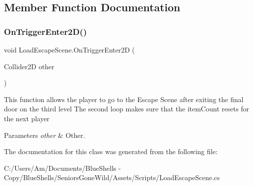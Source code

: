 \subsection{Member Function Documentation}
\mbox{\label{class_load_escape_scene_a5fd7bb04123701797923ddee003e3ace}} 
\subsubsection{\texorpdfstring{On\+Trigger\+Enter2\+D()}{OnTriggerEnter2D()}}
{\footnotesize\ttfamily void Load\+Escape\+Scene.\+On\+Trigger\+Enter2D (\begin{DoxyParamCaption}\item[{Collider2D}]{other }\end{DoxyParamCaption})\hspace{0.3cm}{\ttfamily [private]}}



This function allows the player to go to the Escape Scene after exiting the final door on the third level The second loop makes sure that the item\+Count resets for the next player 


\begin{DoxyParams}{Parameters}
{\em other} & Other.\\
\hline
\end{DoxyParams}


The documentation for this class was generated from the following file\+:\begin{DoxyCompactItemize}
\item 
C\+:/\+Users/\+Am/\+Documents/\+Blue\+Shells -\/ Copy/\+Blue\+Shells/\+Seniors\+Gone\+Wild/\+Assets/\+Scripts/Load\+Escape\+Scene.\+cs\end{DoxyCompactItemize}
